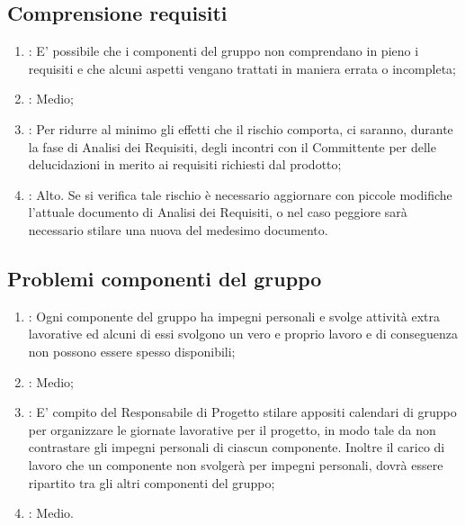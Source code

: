 \subsection{Comprensione requisiti}
\begin{enumerate}
\item {}: E' possibile che i componenti del gruppo non comprendano in pieno i requisiti e che alcuni aspetti vengano trattati in maniera errata o incompleta;
\item {}: Medio;
\item {}: Per ridurre al minimo gli effetti che il rischio comporta, ci saranno, durante la fase di Analisi dei Requisiti, degli incontri con il Committente per delle delucidazioni in merito ai requisiti richiesti dal prodotto;
\item {}: Alto. Se si verifica tale rischio è necessario aggiornare con piccole modifiche l'attuale documento di Analisi dei Requisiti, o nel caso peggiore sarà necessario stilare una nuova  del medesimo documento.
\end{enumerate}

\subsection{Problemi componenti del gruppo}
\begin{enumerate}
\item {}: Ogni componente del gruppo ha impegni personali e svolge attività extra lavorative ed alcuni di essi svolgono un vero e proprio lavoro e di conseguenza non possono essere spesso disponibili;
\item {}: Medio;
\item {}: E' compito del Responsabile di Progetto stilare appositi calendari di gruppo per organizzare le giornate lavorative per il progetto, in modo tale da non contrastare gli impegni personali di ciascun componente. Inoltre il carico di lavoro che un componente non svolgerà per impegni personali, dovrà essere ripartito tra gli altri componenti del gruppo;
\item {}: Medio.
\end{enumerate}

